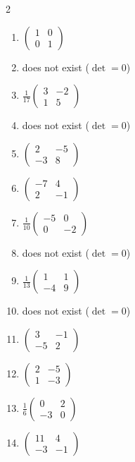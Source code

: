 \begin{multicols}{2}
\begin{enumerate}[label=\arabic*., leftmargin=*, itemsep=1pt]
\item $\left(\begin{smallmatrix}1 & 0\\ 0 & 1\end{smallmatrix}\right)$
\item does not exist ($\det=0$)
\item $\frac{1}{17}\left(\begin{smallmatrix}3 & -2\\ 1 & 5\end{smallmatrix}\right)$
\item does not exist ($\det=0$)
\item $\left(\begin{smallmatrix}2 & -5\\ -3 & 8\end{smallmatrix}\right)$
\item $\left(\begin{smallmatrix}-7 & 4\\ 2 & -1\end{smallmatrix}\right)$
\item $\frac{1}{10}\left(\begin{smallmatrix}-5 & 0\\ 0 & -2\end{smallmatrix}\right)$
\item does not exist ($\det=0$)
\item $\frac{1}{13}\left(\begin{smallmatrix}1 & 1\\ -4 & 9\end{smallmatrix}\right)$
\item does not exist ($\det=0$)
\item $\left(\begin{smallmatrix}3 & -1\\ -5 & 2\end{smallmatrix}\right)$
\item $\left(\begin{smallmatrix}2 & -5\\ 1 & -3\end{smallmatrix}\right)$
\item $\frac{1}{6}\left(\begin{smallmatrix}0 & 2\\ -3 & 0\end{smallmatrix}\right)$
\item $\left(\begin{smallmatrix}11 & 4\\ -3 & -1\end{smallmatrix}\right)$

\end{enumerate}
\end{multicols}
